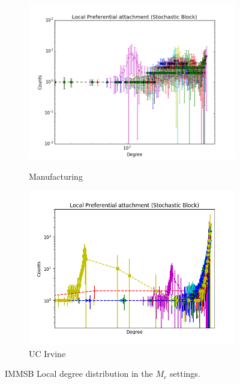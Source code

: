 \begin{figure}[h]
\begin{subfigure}[b]{0.300\textwidth}
            \centering
            \includegraphics[width=\textwidth]{img/expe/5_ibp/figure_2}
            \label{fig:mean and std of net14}
            \caption {{\small Manufacturing}}    
        \end{subfigure}
        \begin{subfigure}[b]{0.300\textwidth}
            \centering
            \includegraphics[width=\textwidth]{img/expe/6_ibp/figure_2}
            \caption {{\small UC Irvine}}    
            \label{fig:mean and std of net14}
        \end{subfigure}
        \caption{IMMSB Local degree distribution in the $M_e$ settings. } 
\end{figure}
